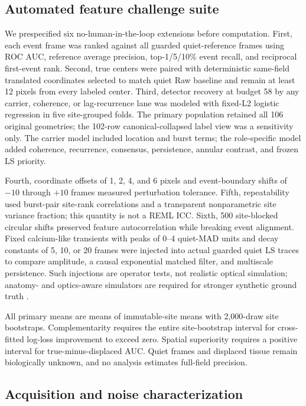 \subsection{Automated feature challenge suite}
\label{sec:automated-feature-validation-methods}

We prespecified six no-human-in-the-loop extensions before computation. First,
each event frame was ranked against all guarded quiet-reference frames using
ROC AUC, reference average precision, top-1/5/10\% event recall, and reciprocal
first-event rank. Second, true centers were paired with deterministic same-field
translated coordinates selected to match quiet Raw baseline and remain at
least 12 pixels from every labeled center. Third, detector recovery at budget
58 by any carrier, coherence, or lag-recurrence lane was modeled with fixed-L2
logistic regression in five site-grouped folds. The primary population retained
all 106 original geometries; the 102-row canonical-collapsed label view was a
sensitivity only. The carrier model included location and burst terms; the
role-specific model added coherence, recurrence, consensus, persistence,
annular contrast, and frozen LS priority.

Fourth, coordinate offsets of 1, 2, 4, and 6 pixels and event-boundary shifts
of $-10$ through $+10$ frames measured perturbation tolerance. Fifth,
repeatability used burst-pair site-rank correlations and a transparent
nonparametric site variance fraction; this quantity is not a REML ICC. Sixth,
500 site-blocked circular shifts preserved feature autocorrelation while
breaking event alignment. Fixed calcium-like transients with peaks of 0--4
quiet-MAD units and decay constants of 5, 10, or 20 frames were injected into
actual guarded quiet LS traces to compare amplitude, a causal exponential
matched filter, and multiscale persistence. Such injections are operator tests,
not realistic optical simulation; anatomy- and optics-aware simulators are
required for stronger synthetic ground truth \citep{song2021naomi}.

All primary means are means of immutable-site means with 2,000-draw site
bootstraps. Complementarity requires the entire site-bootstrap interval for
cross-fitted log-loss improvement to exceed zero. Spatial superiority requires
a positive interval for true-minus-displaced AUC. Quiet frames and displaced
tissue remain biologically unknown, and no analysis estimates full-field
precision.

\subsection{Acquisition and noise characterization}
\label{sec:acquisition-methods}

